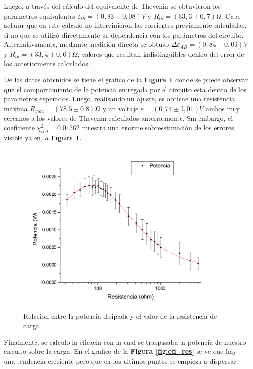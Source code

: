 \documentclass[11pt,a4paper]{article}
\begin{document}
Luego, a través del cálculo del equivalente de Thevenin se obtuvieron los parametros equivalentes $\varepsilon_{th} = (0,83\pm0,08)V$ y $R_{th} = (83,3 \pm 0,7) \Omega$. Cabe aclarar que en este cálculo no intervinieron las corrientes previamente calculadas, si no que se utilizó directamente su dependencia con los parámetros del circuito. Alternativamente, mediante medición directa se obtuvo $\Delta\varepsilon_{AB} = (0,84 \pm 0,06)V$ y $R_{th} = (83,4 \pm 0,6)\Omega$, valores que resultan indistinguibles dentro del error de los anteriormente calculados. 

De los datos obtenidos se tiene el gráfico de la \textbf{Figura \ref{fig:pot_res}} donde se puede observar que el comportamiento de la potencia entregada por el circuito esta dentro de los parametros esperados. Luego, realizando un ajuste, se obtiene una resistencia máxima $R_{max} = (78.5 \pm 0.8)\Omega$ y un voltaje $\varepsilon = (0,74\pm 0,01)V$ ambos muy cercanos a los valores de Thevenin calculados anteriormente. Sin embargo, el coeficiente $\chi_{red}^{2} = 0.01362$ muestra una enorme sobreestimación de los errores, visible ya en la \textbf{Figura \ref{fig:pot_res}}.

\begin{figure}[h]
  \centering
  \includegraphics[scale=0.4]{Potencia_vs_Resistencia_2}
  \caption{Relacion entre la potencia disipada y el valor de la resistencia de carga}
  \label{fig:pot_res}
\end{figure}

Finalmente, se calculo la eficacia con la cual se traspasaba la potencia de nuestro circuito sobre la carga. En el grafico de la \textbf{Figura \ref{fig:efi_res}} se ve que hay una tendencia creciente pero que en los ultimos puntos se empieza a dispersar. 
\end{document}
